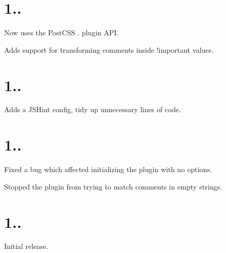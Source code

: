 \section*{1..}


\begin{DoxyItemize}
\item Now uses the Post\+C\+SS {.} plugin A\+PI.
\item Adds support for transforming comments inside {\ttfamily !important} values.
\end{DoxyItemize}

\section*{1..}


\begin{DoxyItemize}
\item Adds a J\+S\+Hint config, tidy up unnecessary lines of code.
\end{DoxyItemize}

\section*{1..}


\begin{DoxyItemize}
\item Fixed a bug which affected initializing the plugin with no options.
\item Stopped the plugin from trying to match comments in empty strings.
\end{DoxyItemize}

\section*{1..}


\begin{DoxyItemize}
\item Initial release. 
\end{DoxyItemize}